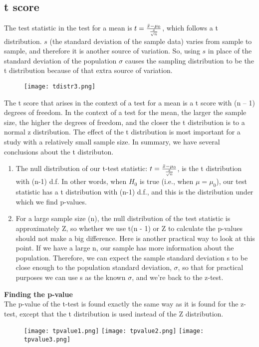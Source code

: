 \documentclass[10pt, a4paper]{article}
\begin{document}
\subsection{t score}
The test statistic in the test for a mean is 
$t = \frac{\bar{x}- \mu_0}{{s \over \sqrt{n}}}$,
which follows a t distribution.  $s$ (the standard deviation of the sample data) varies from sample to sample, and therefore it is another source of variation. So, using $s$ in place of the standard deviation of the population $\sigma$ causes the sampling distribution to be the t distribution because of that extra source of variation.
\begin{figure}
    [h!]
    \centering
    \texttt{[image: tdistr3.png]}
\end{figure}
The t score that arises in the context of a test for a mean is a t score with (n – 1) degrees of freedom. In the context of a test for the mean, the larger the sample size, the higher the degrees of freedom, and the closer the t distribution is to a normal z distribution. The effect of the t distribution is most important for a study with a relatively small sample size.
In summary, we have several conclusions about the t distributon.
\begin{enumerate}
\item  The null distribution of our t-test statistic: 
$t = \frac{\bar{x}- \mu_0}{{s \over \sqrt{n}}}$,
is the t distribution with (n-1) d.f. In other words, when $H_0$ is true (i.e., when
$\mu=\mu_0$), our test statistic has a t distribution with (n-1) d.f., and this is the distribution under which we find p-values.
\item For a large sample size (n), the null distribution of the test statistic is approximately Z, so whether we use t(n - 1) or Z to calculate the p-values should not make a big difference. Here is another practical way to look at this point. If we have a large n, our sample has more information about the population. Therefore, we can expect the sample standard deviation s to be close enough to the population standard deviation, $\sigma$, so that for practical purposes we can use s as the known $\sigma$, and we're back to the z-test.
\end{enumerate}
\textbf{Finding the p-value}\\
The p-value of the t-test is found exactly the same way as it is found for the z-test, except that the t distribution is used instead of the Z distribution.
\begin{figure}
    [h!]
    \centering
    \texttt{[image: tpvalue1.png]}
    \texttt{[image: tpvalue2.png]}
    \texttt{[image: tpvalue3.png]}
\end{figure}\\
\end{document}
